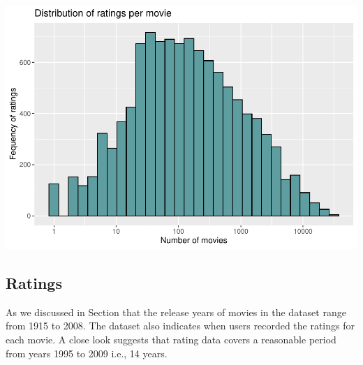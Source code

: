 \documentclass[]{article}
\newenvironment{Shaded}{\begin{snugshade}}{\end{snugshade}}
\newcommand{\CommentTok}[1]{\textcolor[rgb]{0.56,0.35,0.01}{\textit{#1}}}
\newcommand{\DataTypeTok}[1]{\textcolor[rgb]{0.13,0.29,0.53}{#1}}
\newcommand{\DecValTok}[1]{\textcolor[rgb]{0.00,0.00,0.81}{#1}}
\newcommand{\KeywordTok}[1]{\textcolor[rgb]{0.13,0.29,0.53}{\textbf{#1}}}
\newcommand{\NormalTok}[1]{#1}
\newcommand{\OperatorTok}[1]{\textcolor[rgb]{0.81,0.36,0.00}{\textbf{#1}}}
\newcommand{\StringTok}[1]{\textcolor[rgb]{0.31,0.60,0.02}{#1}}
\begin{document}
\begin{Shaded}
\end{Shaded}

\includegraphics{Project_MovieLens_files/figure-latex/unnamed-chunk-12-1.pdf}

\subsection{Ratings}
\label{sec:ratings}

As we discussed in Section \label{sec:movies} that the release years of
movies in the dataset range from 1915 to 2008. The dataset also
indicates when users recorded the ratings for each movie. A close look
suggests that rating data covers a reasonable period from years 1995 to
2009 i.e., 14 years.
\end{document}
